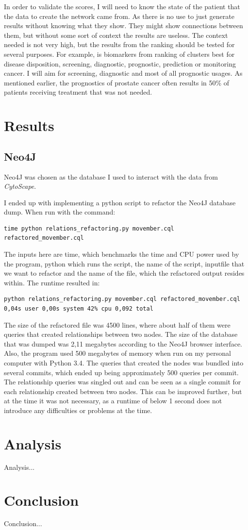 \documentclass[UKenglish]{ifimaster}
\begin{document}
In order to validate the scores, I will need to know the state of the patient that the data to create the network came
from. As there is no use to just generate results without knowing what they show. They might show connections between
them, but without some sort of context the results are useless. The context needed is not very high, but the results
from the ranking should be tested for several purposes. For example, is biomarkers from ranking of clusters best for
disease disposition, screening, diagnostic, prognostic, prediction or monitoring cancer. I will aim for screening,
diagnostic and most of all prognostic usages. As mentioned earlier, the prognostics of prostate cancer often results in
50\% of patients receiving treatment that was not needed.

\part{Results}
\chapter{Neo4J}
Neo4J was chosen as the database I used to interact with the data from \textit{CytoScape}.

I ended up with implementing a python script to refactor the Neo4J database dump. When run with the command:
\begin{verbatim}
time python relations_refactoring.py movember.cql refactored_movember.cql
\end{verbatim}
The inputs here are time, which benchmarks the time and CPU power used by the program, python which runs the script, the
name of the script, inputfile that we want to refactor and the name of the file, which the refactored output resides
within.
The runtime resulted in:
\begin{verbatim}
python relations_refactoring.py movember.cql refactored_movember.cql  0,04s user 0,00s system 42% cpu 0,092 total
\end{verbatim}
The size of the refactored file was 4500 lines, where about half of them were queries that created relationships between
two nodes. The size of the database that was dumped was 2,11 megabytes according to the Neo4J browser interface. Also,
the program used 500 megabytes of memory when run on my personal computer with Python 3.4. The queries that created the
nodes was bundled into several commits, which ended up being approximately 500 queries per commit. The relationship
queries was singled out and can be seen as a single commit for each relationship created between two nodes. This can be
improved further, but at the time it was not necessary, as a runtime of below 1 second does not introduce any
difficulties or problems at the time.
\part{Analysis}
Analysis...
\part{Conclusion}
Conclusion...
\backmatter{}
\printbibliography
\end{document}
